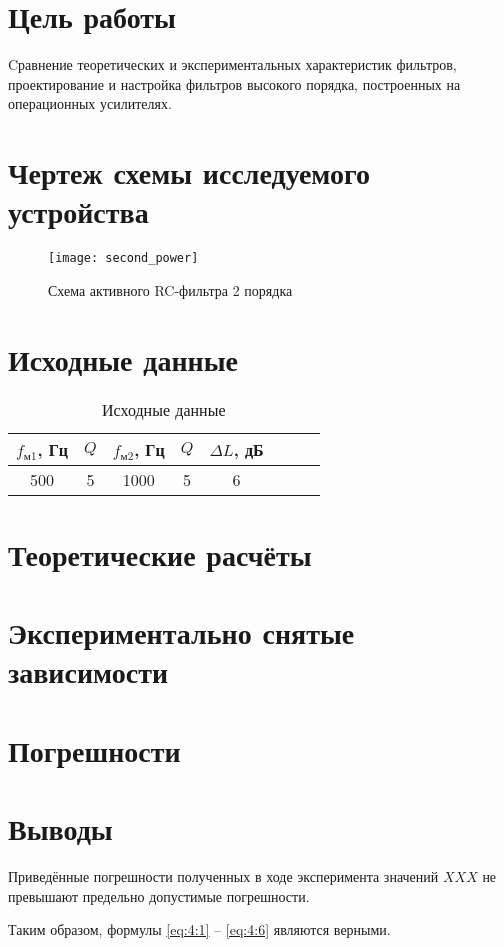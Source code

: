 





\section{Цель работы}

Cравнение теоретических и экспериментальных характеристик фильтров,
проектирование и настройка фильтров высокого порядка, построенных на
операционных усилителях. 

\section{Чертеж схемы исследуемого устройства}

\begin{figure}[H]
\begin{center}
	\texttt{[image: second\_power]}
	\caption{Схема активного RC-фильтра 2 порядка}
\end{center}
\end{figure}

\section{Исходные данные}

\begin{table}[H]
\begin{center}
	\caption{Исходные данные}
	\def\tabcolsep{20pt}
	\begin{tabular}{|c|c|c|c|c|c|c|c|}
		\hline
		$f_{\text{м1}}$, Гц &
		$Q$ &
		$f_{\text{м2}}$, Гц &
		$Q$ &
		$\Delta L$, дБ \\
		\hline
		500 &
		5 &
		1000 &
		5 &
		6 \\
	    \hline	
	\end{tabular}
\end{center}
\end{table}

\section{Теоретические расчёты}

\section{Экспериментально снятые зависимости}

\section{Погрешности}

\section{Выводы}

Приведённые погрешности полученных в ходе эксперимента значений $XXX$ не превышают предельно допустимые погрешности.

Таким образом, формулы \ref{eq:4:1} -- \ref{eq:4:6} являются верными.

